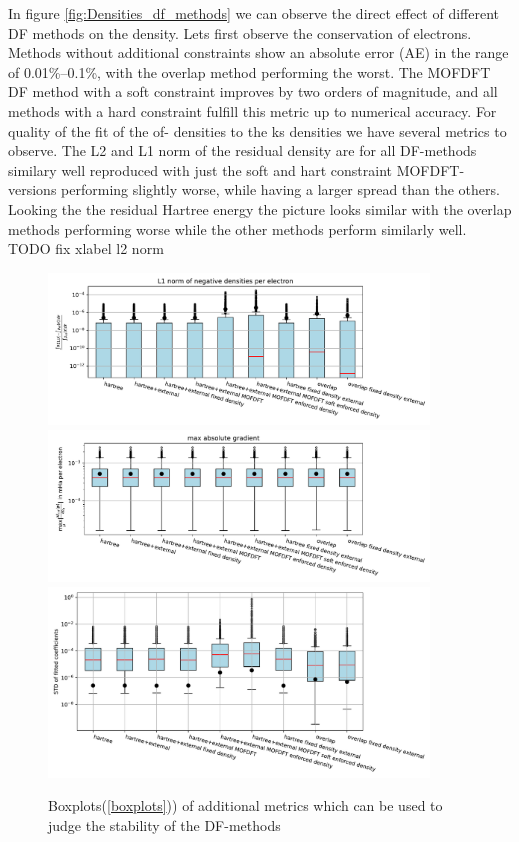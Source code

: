 In figure \ref{fig:Densities_df_methods} we can observe the direct effect of different DF methods on the density. Lets first observe the conservation of electrons. Methods without additional constraints show an absolute error (AE) in the range of 0.01\%–0.1\%, with the overlap method performing the worst. The MOFDFT DF method with a soft constraint improves by two orders of magnitude, and all methods with a hard constraint fulfill this metric up to numerical accuracy. For quality of the fit of the of- densities to the ks densities we have several metrics to observe. The L2 and L1 norm of the residual density are for all DF-methods similary well reproduced with just the soft and hart constraint MOFDFT-versions performing slightly worse, while having a larger spread than the others. Looking the the residual Hartree energy the picture looks similar with the overlap methods performing worse while the other methods perform similarly well.
TODO fix xlabel l2 norm
\begin{figure}
    \includegraphics[width=0.9\textwidth]{chapters/results/results_images/L1_negative_densities_on_even_tempered_2.5_for_different_df_methods}
    \includegraphics[width=0.9\textwidth]{chapters/results/results_images/max_abs_gradient_on_even_tempered_2.5_for_different_df_methods}
    \includegraphics[width=0.9\textwidth]{chapters/results/results_images/var_density_fitting}
    \caption{Boxplots(\ref{boxplots})) of additional metrics which can be used to judge the stability of the DF-methods}
    \label{fig:other_df_metrics}
\end{figure}
